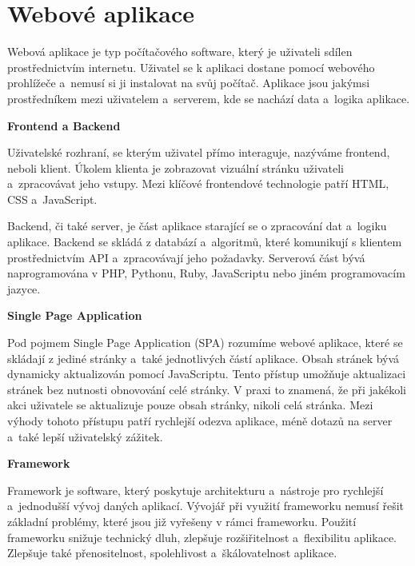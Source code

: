 \section{Webové aplikace}

Webová aplikace je typ počítačového software, který je uživateli sdílen prostřednictvím internetu. 
Uživatel se k aplikaci dostane pomocí webového prohlížeče a~nemusí si ji instalovat na svůj počítač. 
Aplikace jsou jakýmsi prostředníkem mezi uživatelem a~serverem, kde se nachází data a~logika aplikace.\cite{codeacademywebapp}

\begin{flushleft}
  \textbf{Frontend a Backend}
\end{flushleft}

Uživatelské rozhraní, se kterým uživatel přímo interaguje, nazýváme frontend, neboli klient.
Úkolem klienta je zobrazovat vizuální stránku uživateli a~zpracovávat jeho vstupy. 
Mezi klíčové frontendové technologie patří HTML, CSS a~JavaScript.

Backend, či také server, je část aplikace starající se o zpracování dat a~logiku aplikace. 
Backend se skládá z databází a~algoritmů, které komunikují s klientem prostřednictvím API a~zpracovávají jeho požadavky. 
Serverová část bývá naprogramována v PHP, Pythonu, Ruby, JavaScriptu nebo jiném programovacím jazyce.\cite{stateofartframeworks}

\begin{flushleft}
  \textbf{Single Page Application}
\end{flushleft}

Pod pojmem Single Page Application (SPA) rozumíme webové aplikace, které se skládají z jediné stránky a~také jednotlivých částí aplikace. 
Obsah stránek bývá dynamicky aktualizován pomocí JavaScriptu. Tento přístup umožňuje aktualizaci stránek bez nutnosti obnovování celé stránky. 
V praxi to znamená, že při jakékoli akci uživatele se aktualizuje pouze obsah stránky, nikoli celá stránka. 
Mezi výhody tohoto přístupu patří rychlejší odezva aplikace, méně dotazů na server a~také lepší uživatelský zážitek.\cite{jadhavspa}

\begin{flushleft}
  \textbf{Framework}
\end{flushleft}

Framework je software, který poskytuje architekturu a~nástroje pro rychlejší a~jednodušší vývoj daných aplikací. 
Vývojář při využití frameworku nemusí řešit základní problémy, které jsou již vyřešeny v rámci frameworku. 
Použití frameworku snižuje technický dluh, zlepšuje rozšiřitelnost a~flexibilitu aplikace. 
Zlepšuje také přenositelnost, spolehlivost a~škálovatelnost aplikace.\cite{schmidtframeworks}